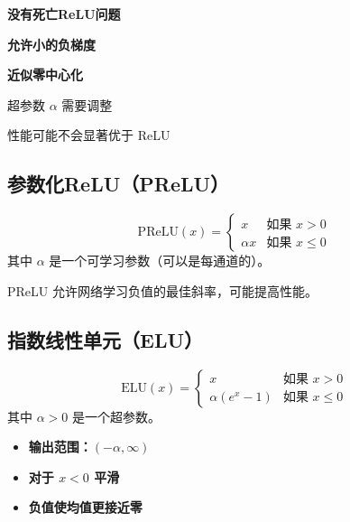\begin{advantages}
    \item \textbf{没有死亡ReLU问题}
    \item \textbf{允许小的负梯度}
    \item \textbf{近似零中心化}
\end{advantages}

\begin{disadvantages}
    \item 超参数 $\alpha$ 需要调整
    \item 性能可能不会显著优于 ReLU
\end{disadvantages}

\subsection{参数化ReLU（PReLU）}

\begin{equation}
\text{PReLU}(x) = 
\begin{cases}
x & \text{如果 } x > 0 \\
\alpha x & \text{如果 } x \leq 0
\end{cases}
\end{equation}
其中 $\alpha$ 是一个可学习参数（可以是每通道的）。

\begin{note}
PReLU 允许网络学习负值的最佳斜率，可能提高性能。
\end{note}

\subsection{指数线性单元（ELU）}

\begin{equation}
\text{ELU}(x) = 
\begin{cases}
x & \text{如果 } x > 0 \\
\alpha(e^x - 1) & \text{如果 } x \leq 0
\end{cases}
\end{equation}
其中 $\alpha > 0$ 是一个超参数。

\begin{properties}[ELU的性质]
\begin{itemize}
    \item \textbf{输出范围：}$(-\alpha, \infty)$
    \item \textbf{对于 $x < 0$ 平滑}
    \item \textbf{负值使均值更接近零}
\end{itemize}
\end{properties}

